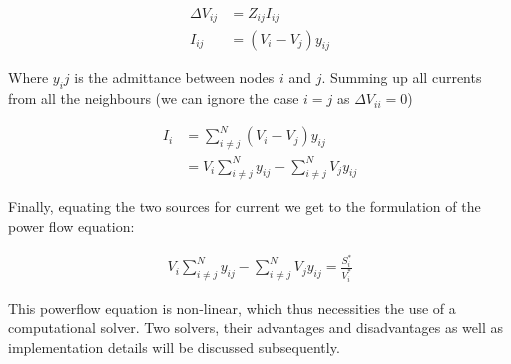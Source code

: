 \begin{equation}
    \begin{aligned}
        \Delta V_{ij} &= Z_{ij} I_{ij} \\
        I_{ij}        &= (V_i - V_j) y_{ij}
    \end{aligned}
\end{equation}

Where $y_ij$ is the admittance between nodes $i$ and $j$.
Summing up all currents from all the neighbours (we can ignore the case $i = j$ as $\Delta V_{ii} = 0$)

\begin{equation}
    \begin{aligned}
        I_{i} &= \sum_{i \ne j}^N (V_i - V_j) y_{ij}\\
              &= V_i \sum_{i \ne j}^N y_{ij} - \sum_{i \ne j}^N V_j y_{ij}
    \end{aligned}
\end{equation}

Finally, equating the two sources for current we get to the formulation of the power flow
equation:

\begin{equation}
    \begin{aligned}
        V_i \sum_{i \ne j}^N y_{ij} - \sum_{i \ne j}^N V_j y_{ij} = \frac{S_i^*}{V_i^*}
    \end{aligned}
\end{equation}

This powerflow equation is non-linear, which thus necessities the use of a computational
solver. Two solvers, their advantages and disadvantages as well as implementation details will
be discussed subsequently.

